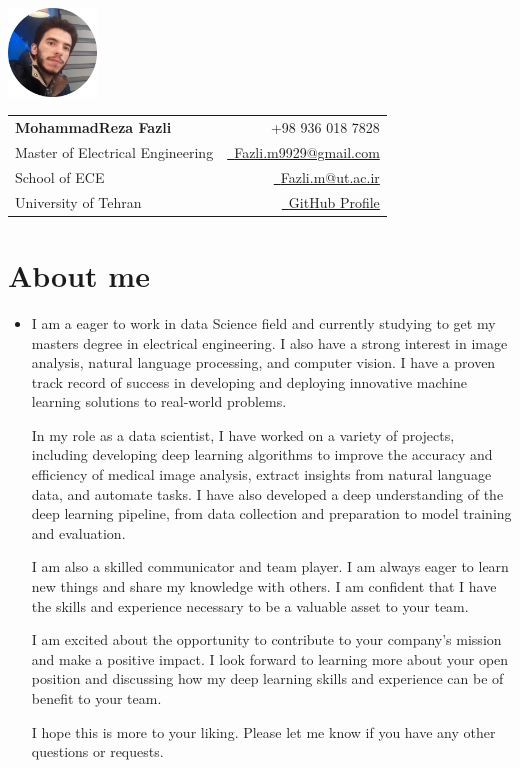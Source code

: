 \documentclass[a4paper,11pt]{article}
\makeatletter
\newcommand{\name}{MohammadReza Fazli} %
\newcommand{\course}{Master of Electrical Engineering} %
\newcommand{\phone}{936 018 7828} %
\newcommand{\emaila}{Fazli.m9929@gmail.com} %
\newcommand{\emailb}{Fazli.m@ut.ac.ir} %
\makeatother
\begin{document}
\selectfont


\parbox{2.6cm}{%
\includegraphics[width=2.35cm,clip]{my_pic.png}
}
\parbox{\dimexpr\linewidth-2.9cm\relax}{
\begin{tabularx}{\linewidth}{L r} \\
  \textbf{\Large \name} & {\raisebox{0.0\height}{\footnotesize \faPhone}\ +98 \phone}\\
  \course & \href{mailto:\emaila}{\raisebox{0.0\height}{\footnotesize \faEnvelope}\ {\emaila}} \\
  {School of ECE} &  \href{mailto:\emailb}{\raisebox{0.0\height}{\footnotesize \faEnvelope}\ {\emailb}}\\
  {University of Tehran} &  \href{https://github.com/Mohammad9929/}{\raisebox{0.0\height}{\footnotesize \faGithub}\ {GitHub Profile}} \\
\end{tabularx}
}


\section{\textbf{About me}}
  \justifying
  \begin{itemize}[leftmargin=0.1in, label={}]
    \item{
      I am a eager to work in data Science field and currently studying to get my masters degree in electrical engineering. I also have a strong interest in image analysis, natural language processing, and computer vision.
      I have a proven track record of success in developing and deploying innovative machine learning solutions to real-world problems.

      In my role as a data scientist, I have worked on a variety of projects, including developing deep learning algorithms to improve the accuracy and efficiency of medical image analysis, extract insights from natural language data, and automate tasks.
      I have also developed a deep understanding of the deep learning pipeline, from data collection and preparation to model training and evaluation.

      I am also a skilled communicator and team player.
      I am always eager to learn new things and share my knowledge with others.
      I am confident that I have the skills and experience necessary to be a valuable asset to your team.

      I am excited about the opportunity to contribute to your company's mission and make a positive impact.
      I look forward to learning more about your open position and discussing how my deep learning skills and experience can be of benefit to your team.

      I hope this is more to your liking. Please let me know if you have any other questions or requests.
    }
 \end{itemize}
 \vspace{-16pt}
\end{document}
